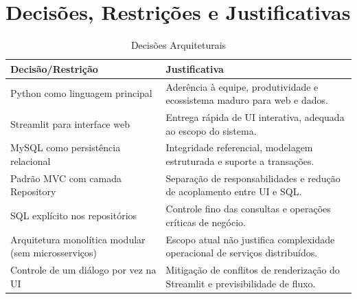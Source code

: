 \section{Decisões, Restrições e Justificativas}
\begin{table}[H]
    \centering
    \begin{tabular}{|p{5cm}|p{9cm}|}
        \hline
        \textbf{Decisão/Restrição} & \textbf{Justificativa} \\ \hline
        Python como linguagem principal & Aderência à equipe, produtividade e ecossistema maduro para web e dados. \\ \hline
        Streamlit para interface web & Entrega rápida de UI interativa, adequada ao escopo do sistema. \\ \hline
        MySQL como persistência relacional & Integridade referencial, modelagem estruturada e suporte a transações. \\ \hline
        Padrão MVC com camada Repository & Separação de responsabilidades e redução de acoplamento entre UI e SQL. \\ \hline
        SQL explícito nos repositórios & Controle fino das consultas e operações críticas de negócio. \\ \hline
        Arquitetura monolítica modular (sem microsserviços) & Escopo atual não justifica complexidade operacional de serviços distribuídos. \\ \hline
        Controle de um diálogo por vez na UI & Mitigação de conflitos de renderização do Streamlit e previsibilidade de fluxo. \\ \hline
    \end{tabular}
    \caption{Decisões Arquiteturais}
\end{table}

